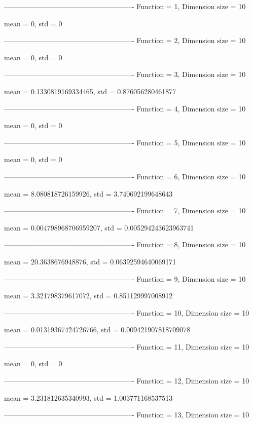 -------------------------------------------------------
Function = 1, Dimension size = 10


mean = 0, std = 0

-------------------------------------------------------
Function = 2, Dimension size = 10


mean = 0, std = 0

-------------------------------------------------------
Function = 3, Dimension size = 10


mean = 0.1330819169334465, std = 0.876056280461877

-------------------------------------------------------
Function = 4, Dimension size = 10


mean = 0, std = 0

-------------------------------------------------------
Function = 5, Dimension size = 10


mean = 0, std = 0

-------------------------------------------------------
Function = 6, Dimension size = 10


mean = 8.080818726159926, std = 3.740692199648643

-------------------------------------------------------
Function = 7, Dimension size = 10


mean = 0.004798968706959207, std = 0.005294243623963741

-------------------------------------------------------
Function = 8, Dimension size = 10


mean = 20.3638676948876, std = 0.06392594640069171

-------------------------------------------------------
Function = 9, Dimension size = 10


mean = 3.321798379617072, std = 0.851129997008912

-------------------------------------------------------
Function = 10, Dimension size = 10


mean = 0.01319367424726766, std = 0.009421907818709078

-------------------------------------------------------
Function = 11, Dimension size = 10


mean = 0, std = 0

-------------------------------------------------------
Function = 12, Dimension size = 10


mean = 3.231812635340993, std = 1.003771168537513

-------------------------------------------------------
Function = 13, Dimension size = 10


